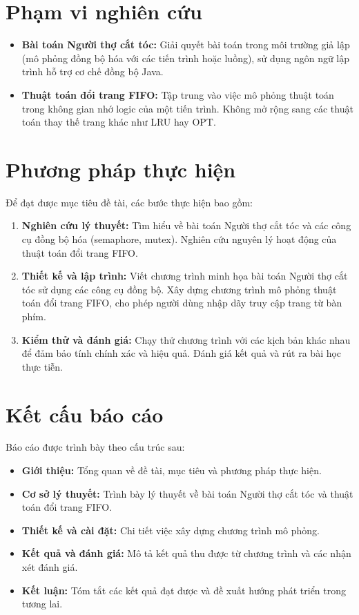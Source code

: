\section{Phạm vi nghiên cứu}
\begin{itemize}
    \item \textbf{Bài toán Người thợ cắt tóc:}  
    Giải quyết bài toán trong môi trường giả lập (mô phỏng đồng bộ hóa với các tiến trình hoặc luồng), sử dụng ngôn ngữ lập trình hỗ trợ cơ chế đồng bộ Java.  
    \item \textbf{Thuật toán đổi trang FIFO:}  
    Tập trung vào việc mô phỏng thuật toán trong không gian nhớ logic của một tiến trình. Không mở rộng sang các thuật toán thay thế trang khác như LRU hay OPT.
\end{itemize}

\section{Phương pháp thực hiện}
Để đạt được mục tiêu đề tài, các bước thực hiện bao gồm:  
\begin{enumerate}
    \item \textbf{Nghiên cứu lý thuyết:}  
    Tìm hiểu về bài toán Người thợ cắt tóc và các công cụ đồng bộ hóa (semaphore, mutex). Nghiên cứu nguyên lý hoạt động của thuật toán đổi trang FIFO.  
    \item \textbf{Thiết kế và lập trình:}  
    Viết chương trình minh họa bài toán Người thợ cắt tóc sử dụng các công cụ đồng bộ. Xây dựng chương trình mô phỏng thuật toán đổi trang FIFO, cho phép người dùng nhập dãy truy cập trang từ bàn phím.  
    \item \textbf{Kiểm thử và đánh giá:}  
    Chạy thử chương trình với các kịch bản khác nhau để đảm bảo tính chính xác và hiệu quả. Đánh giá kết quả và rút ra bài học thực tiễn.
\end{enumerate}

\section{Kết cấu báo cáo}
Báo cáo được trình bày theo cấu trúc sau:  
\begin{itemize}
    \item \textbf{Giới thiệu:} Tổng quan về đề tài, mục tiêu và phương pháp thực hiện.  
    \item \textbf{Cơ sở lý thuyết:} Trình bày lý thuyết về bài toán Người thợ cắt tóc và thuật toán đổi trang FIFO.  
    \item \textbf{Thiết kế và cài đặt:} Chi tiết việc xây dựng chương trình mô phỏng.  
    \item \textbf{Kết quả và đánh giá:} Mô tả kết quả thu được từ chương trình và các nhận xét đánh giá.  
    \item \textbf{Kết luận:} Tóm tắt các kết quả đạt được và đề xuất hướng phát triển trong tương lai.
\end{itemize}

